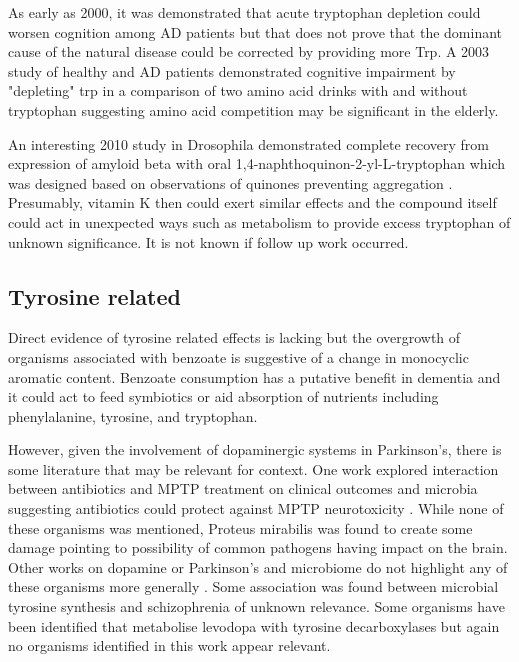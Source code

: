 \documentclass[aps,secnumarabic,balancelastpage,amsmath,amssymb,nofootinbib]{revtex4}
\begin{document}
As early as 2000, it was demonstrated that acute tryptophan
depletion could worsen cognition among AD patients
\cite{Porter_Cognitive_Deficit_Induced_2000} but that does not
prove that the dominant cause of the natural disease could
be corrected by providing more Trp. A 2003 study of healthy 
and AD patients demonstrated cognitive impairment by
"depleting" trp in a comparison of two amino acid drinks with and
without tryptophan \cite{PORTER_LUNN_OBRIEN_Effects_acute_tryptophan_2003}
suggesting amino acid competition may be significant in the elderly.  

An interesting 2010 study in Drosophila demonstrated complete recovery
from expression of amyloid beta with oral  
1,4-naphthoquinon-2-yl-L-tryptophan which was designed based
on observations of quinones preventing aggregation 
\cite{JulietAnnGerrard_Complete_Phenotypic_Recovery_2010}.
Presumably, vitamin K then could exert similar effects
and the compound itself could act in unexpected ways 
such as metabolism  to provide
excess tryptophan of unknown significance. It is not known if
follow up work occurred. 
 


\subsection{Tyrosine related}
Direct evidence of tyrosine related effects is lacking
but the overgrowth of organisms associated with benzoate
is suggestive of a change in monocyclic aromatic content.
Benzoate consumption has a putative benefit in dementia
\cite{Lin_Chen_Wang_Effect_Sodium_Benzoate_2021}
and it could act to feed symbiotics or aid absorption
of nutrients including phenylalanine, tyrosine, and tryptophan. 

However, given the involvement of dopaminergic systems in
Parkinson's, there is some literature that may be relevant for
context. One work explored interaction between antibiotics
and MPTP treatment on clinical outcomes and microbia 
suggesting antibiotics could protect against
MPTP neurotoxicity \cite{PMC6756889}. 
While none of these organisms was mentioned,
Proteus mirabilis was found to create some damage
 pointing to possibility of common pathogens having impact on the brain. 
Other works on dopamine or Parkinson's and microbiome
do not highlight any of these organisms more generally 
\cite{Hamamah_Aghazarian_Nazaryan_Role_Microbiota_2022}
.
Some association was found between microbial tyrosine synthesis
and schizophrenia \cite{THIRION2023283} of unknown relevance.
Some organisms have been identified that metabolise levodopa
with tyrosine decarboxylases
\cite{vanKessel_Frye_ElGendy_bacterial_tyrosine_decarboxylases_2019}
but again no organisms identified in this work appear relevant.
\end{document}
